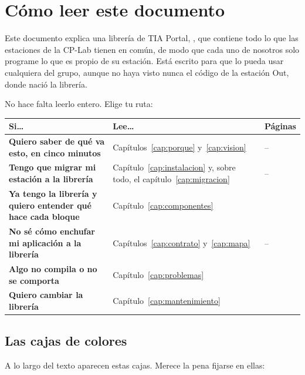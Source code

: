 \chapter*{Cómo leer este documento}

Este documento explica una librería de TIA Portal, \lib, que contiene todo lo que las estaciones de la CP-Lab tienen en común, de modo que cada uno de nosotros solo programe lo que es propio de su estación. Está escrito para que lo pueda usar cualquiera del grupo, aunque no haya visto nunca el código de la estación Out, donde nació la librería.

No hace falta leerlo entero. Elige tu ruta:

\begin{center}
\small
\begin{tabularx}{\textwidth}{>{\bfseries}p{4.3cm}X>{\raggedleft\arraybackslash}p{2.6cm}}
\toprule
Si… & Lee… & Páginas \\
\midrule
Quiero saber de qué va esto, en cinco minutos & Capítulos~\ref{cap:porque} y~\ref{cap:vision} & \pageref{cap:porque}--\pageref{cap:conceptos} \\
Tengo que \textbf{migrar mi estación} a la librería & Capítulo~\ref{cap:instalacion} y, sobre todo, el capítulo~\ref{cap:migracion} & \pageref{cap:instalacion}--\pageref{cap:pruebas} \\
Ya tengo la librería y quiero entender \textbf{qué hace cada bloque} & Capítulo~\ref{cap:componentes} & \pageref{cap:componentes} \\
No sé cómo enchufar mi aplicación a la librería & Capítulos~\ref{cap:contrato} y~\ref{cap:mapa} & \pageref{cap:contrato}--\pageref{cap:instalacion} \\
Algo \textbf{no compila} o no se comporta & Capítulo~\ref{cap:problemas} & \pageref{cap:problemas} \\
Quiero \textbf{cambiar} la librería & Capítulo~\ref{cap:mantenimiento} & \pageref{cap:mantenimiento} \\
\bottomrule
\end{tabularx}
\end{center}

\section*{Las cajas de colores}
A lo largo del texto aparecen estas cajas. Merece la pena fijarse en ellas:


